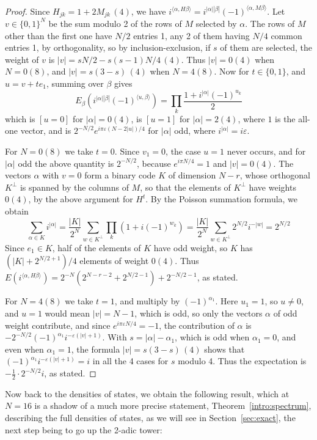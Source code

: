 \documentclass[11pt,a4paper]{article}
\theoremstyle{remark}
\begin{document}
\begin{proof}
Since $H_{jk}=1+2M_{jk}\,(4)$, we have $i^{\langle\alpha,H\beta\rangle}=i^{|\alpha||\beta|}(-1)^{\langle\alpha,M\beta\rangle}$. Let $v\in\{0,1\}^N$ be the sum modulo 2 of the rows of $M$ selected by $\alpha$. The rows of $M$ other than the first one have $N/2$ entries 1, any 2 of them having $N/4$ common entries 1, by orthogonality, so by inclusion-exclusion, if $s$ of them are selected, the weight of $v$ is $|v|=sN/2-s(s-1)N/4\,(4)$. Thus $|v|=0(4)$ when $N=0(8)$, and $|v|=s(3-s)\,(4)$ when $N=4(8)$. Now for $t\in\{0,1\}$, and $u=v+te_1$, summing over $\beta$ gives
\[
 E_\beta\left(i^{|\alpha||\beta|}(-1)^{\langle u,\beta\rangle}\right)=\prod_k\frac{1+i^{|\alpha|}(-1)^{u_k}}{2}
\]
which is $[u=0]$ for $|\alpha|=0(4)$, is $[u=1]$ for $|\alpha|=2(4)$, where $1$ is the all-one vector, and is $2^{-N/2}e^{i\pi\varepsilon(N-2|u|)/4}$ for $|\alpha|$ odd, where $i^{|\alpha|}=i\varepsilon$.

For $N=0(8)$ we take $t=0$. Since $v_1=0$, the case $u=1$ never occurs, and for $|\alpha|$ odd the above quantity is $2^{-N/2}$, because $e^{i\pi N/4}=1$ and $|v|=0(4)$. The vectors $\alpha$ with $v=0$ form a binary code $K$ of dimension $N-r$, whose orthogonal $K^\perp$ is spanned by the columns of $M$, so that the elements of $K^\perp$ have weights $0(4)$, by the above argument for $H^t$. By the Poisson summation formula, we obtain
\[
 \sum_{\alpha\in K}i^{|\alpha|}=\frac{|K|}{2^N}\sum_{w\in K^\perp}\prod_k\left(1+i(-1)^{w_k}\right)=\frac{|K|}{2^N}\sum_{w\in K^\perp}2^{N/2}i^{-|w|}=2^{N/2}
\]
Since $e_1\in K$, half of the elements of $K$ have odd weight, so $K$ has $(|K|+2^{N/2+1})/4$ elements of weight $0(4)$. Thus $E(i^{\langle\alpha,H\beta\rangle})=2^{-N}(2^{N-r-2}+2^{N/2-1})+2^{-N/2-1}$, as stated.

For $N=4(8)$ we take $t=1$, and multiply by $(-1)^{\alpha_1}$. Here $u_1=1$, so $u\neq0$, and $u=1$ would mean $|v|=N-1$, which is odd, so only the vectors $\alpha$ of odd weight contribute, and since $e^{i\pi\varepsilon N/4}=-1$, the contribution of $\alpha$ is $-2^{-N/2}(-1)^{\alpha_1}i^{-\varepsilon(|v|+1)}$. With $s=|\alpha|-\alpha_1$, which is odd when $\alpha_1=0$, and even when $\alpha_1=1$, the formula $|v|=s(3-s)\,(4)$ shows that $(-1)^{\alpha_1}i^{-\varepsilon(|v|+1)}=i$ in all the 4 cases for $s$ modulo 4. Thus the expectation is $-\frac{1}{2}\cdot2^{-N/2}i$, as stated.
\end{proof}

Now back to the densities of states, we obtain the following result, which at $N=16$ is a shadow of a much more precise statement, Theorem~\ref{intro:spectrum}, describing the full densities of states, as we will see in Section~\ref{sec:exact}, the next step being to go up the 2-adic tower:
\end{document}
